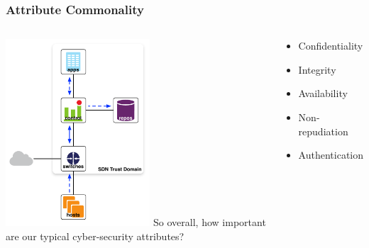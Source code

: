 \documentclass[t,handout]{beamer}
\begin{document}
\begin{frame}
\frametitle{Attribute Commonality}
\begin{columns}[T]
\includegraphics[height=2.75in]{reference-model}
So overall, how important are our typical cyber-security attributes?
\\~\\
\begin{beamerboxesrounded}[shadow]{}
\begin{itemize}
\item {\color{green} Confidentiality}
\item {\color{red} Integrity}
\item {\color{orange} Availability}
\item {\color{green} Non-repudiation}
\item {\color{red} Authentication}
\end{itemize}
\end{beamerboxesrounded}
\end{columns}
\end{frame}
\end{document}
